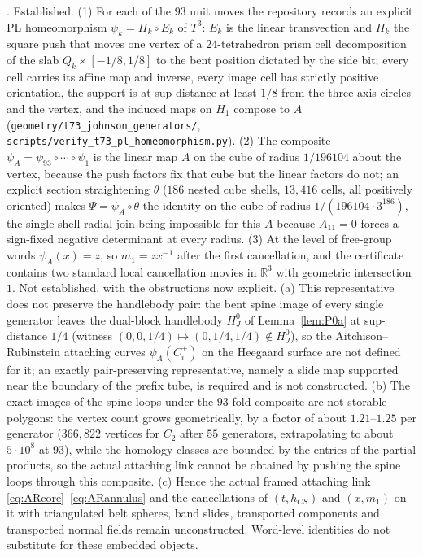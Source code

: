 \begin{remark}
\Open.  Established.  (1) For each of the $93$ unit moves the repository
records an explicit PL homeomorphism $\psi_k=\Pi_k\circ E_k$ of $T^3$:
$E_k$ is the linear transvection and $\Pi_k$ the square push that moves one
vertex of a $24$-tetrahedron prism cell decomposition of the slab
$Q_k\times[-1/8,1/8]$ to the bent position dictated by the side bit; every
cell carries its affine map and inverse, every image cell has strictly
positive orientation, the support is at sup-distance at least $1/8$ from
the three axis circles and the vertex, and the induced maps on $H_1$
compose to $A$ (\texttt{geometry/t73\_johnson\_generators/},
\texttt{scripts/verify\_t73\_pl\_homeomorphism.py}).  (2) The composite
$\psi_A=\psi_{93}\circ\cdots\circ\psi_1$ is the linear map $A$ on the cube
of radius $1/196104$ about the vertex, because the push factors fix that
cube but the linear factors do not; an explicit section straightening
$\theta$ ($186$ nested cube shells, $13{,}416$ cells, all positively
oriented) makes $\Psi=\psi_A\circ\theta$ the identity on the cube of
radius $1/(196104\cdot3^{186})$, the single-shell radial join being
impossible for this $A$ because $A_{11}=0$ forces a sign-fixed negative
determinant at every radius.  (3) At the level of free-group words
$\psi_A(x)=z$, so $m_1=zx^{-1}$ after the first cancellation, and the
certificate contains two standard local cancellation movies in
$\mathbb R^3$ with geometric intersection $1$.
Not established, with the obstructions now explicit.  (a) This
representative does not preserve the handlebody pair: the bent spine
image of every single generator leaves the dual-block handlebody $H_J^0$
of Lemma~\ref{lem:P0a} at sup-distance $1/4$ (witness
$(0,0,1/4)\mapsto(0,1/4,1/4)\notin H_J^0$), so the Aitchison--Rubinstein
attaching curves $\psi_A(C_i^+)$ on the Heegaard surface are not defined
for it; an exactly pair-preserving representative, namely a slide map
supported near the boundary of the prefix tube, is required and is not
constructed.  (b) The exact images of the spine loops under the
$93$-fold composite are not storable polygons: the vertex count grows
geometrically, by a factor of about $1.21$--$1.25$ per generator
($366{,}822$ vertices for $C_2$ after $55$ generators, extrapolating to
about $5\cdot10^8$ at $93$), while the homology classes are bounded by
the entries of the partial products, so the actual attaching link cannot
be obtained by pushing the spine loops through this composite.  (c) Hence
the actual framed attaching link \eqref{eq:ARcore}--\eqref{eq:ARannulus}
and the cancellations of $(t,h_{CS})$ and $(x,m_1)$ on it with triangulated
belt spheres, band slides, transported components and transported normal
fields remain unconstructed.  Word-level identities do not substitute for
these embedded objects.
\end{remark}

